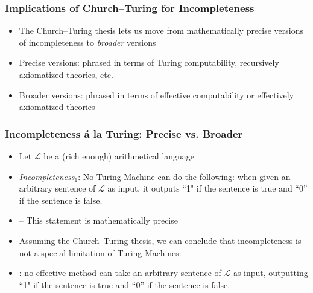 \begin{frame}
\frametitle{Implications of Church--Turing for Incompleteness}

\begin{itemize}[<+->]

\item The Church--Turing thesis lets us move from mathematically precise versions of incompleteness to \textit{broader} versions


\item Precise versions: phrased in terms of Turing computability, recursively axiomatized theories, etc. 

\item Broader versions: phrased in terms of effective computability or effectively axiomatized theories


\end{itemize}
\end{frame}

\begin{frame}
\frametitle{Incompleteness \'a la Turing: Precise vs. Broader}

\begin{itemize}[<+->]

\item Let $\mathcal{L}$ be a (rich enough) arithmetical language

\item \emph{Incompleteness$_1$}: No \textcolor{highlightA}{Turing Machine} can do the following: when given an arbitrary sentence of $\mathcal{L}$ as input, it outputs ``1" if the sentence is true and ``0'' if the sentence is false. 

\item[] -- This statement is mathematically precise

\item Assuming the Church--Turing thesis, we can conclude that incompleteness is not a special limitation of Turing Machines:

\item {}: no \textcolor{OGlyallpink}{effective method} can take an arbitrary sentence of $\mathcal{L}$ as input, outputting ``1" if the sentence is true and ``0'' if the sentence is false. 


\end{itemize}
\end{frame}

